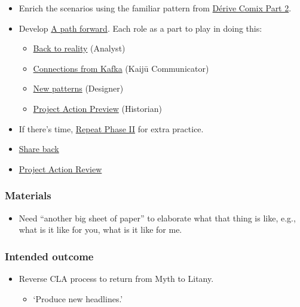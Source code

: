 \documentclass[11pt]{article}
\begin{document}
\begin{enumerate}
\begin{itemize}
\item Enrich the scenarios using the familiar pattern from \hyperref[f447153f-7ff5-449d-bb08-67f579dda53f]{Dérive Comix Part 2}.
\item Develop \hyperref[7c0dce3b-d5ea-4712-a771-6ff26f143686]{A path forward}.  Each role as a part to play in doing this:
\begin{itemize}
\item \hyperref[e38d2006-bcf7-494b-bd51-d8932b1ed0cd]{Back to reality} (Analyst)
\item \hyperref[34be214c-5885-4794-b93c-84e49ddad18b]{Connections from Kafka} (Kaijū Communicator)
\item \hyperref[ed238393-a7e4-4a0d-9eb2-3d6ab745c170]{New patterns} (Designer)
\item \hyperref[baa168fb-37a0-4144-ab16-d4962728ea9c]{Project Action Preview} (Historian)
\end{itemize}
\item If there's time, \hyperref[092e4fe4-ee4f-494d-8776-c5f1389e8dc0]{Repeat Phase II} for extra practice.
\item \hyperref[848c8c3d-cde3-48b4-9dae-23eca4db440d]{Share back}
\item \hyperref[f5a1bc15-5abb-44d6-8f7a-e254974c9002]{Project Action Review}
\end{itemize}
\end{enumerate}

\subsubsection{Materials}
\label{sec:orgad6d242}
\begin{itemize}
\item Need ``another big sheet of paper'' to elaborate what that thing is like, e.g., what is it like for you, what is it like for me.
\end{itemize}

\subsubsection{Intended outcome}
\label{sec:org7a90b87}
\begin{itemize}
\item Reverse CLA process to return from Myth to Litany.
\begin{itemize}
\item ‘Produce new headlines.’
\end{itemize}
\end{itemize}
\end{document}
